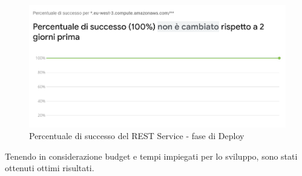 \documentclass{natourDoc}
\begin{document}
\begin{figure}[!htbp]
	\centering
	\includegraphics[width=\textwidth]{./analytics/success-performance.png}
	\caption{Percentuale di successo del REST Service - fase di Deploy}
\end{figure}
\FloatBarrier

Tenendo in considerazione budget e tempi impiegati per lo sviluppo, sono stati ottenuti
ottimi risultati.

\newpage

\printglossary
\end{document}
